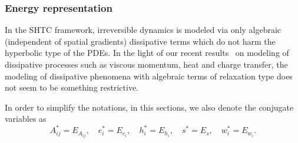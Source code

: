 \documentclass[twoside]{article}
\newcommand{\ted}{E} %
\begin{document}
\subsubsection{Energy representation}

In the SHTC framework, irreversible dynamics is modeled via only algebraic 
(independent of spatial gradients) 
dissipative terms which do not harm the hyperbolic type of the PDEs. In the 
light of our recent 
results~\cite{HPR2016,DPRZ2016,DPRZ2017} on modeling of dissipative 
processes such as viscous momentum, heat and charge transfer, the modeling of 
dissipative phenomena with algebraic terms of relaxation type does not seem to 
be something restrictive. %

In order to simplify the notations, in this sections, we also denote the 
conjugate variables as
\begin{equation}
A_{ij}^* = \ted_{A_{ij}},\quad  e_i^* = \ted_{e_i} ,\quad  h_i^* = 
\ted_{h_i},\quad  s^* = \ted_s,\quad  w_i^* = \ted_{w_i}.
\end{equation}
\end{document}
